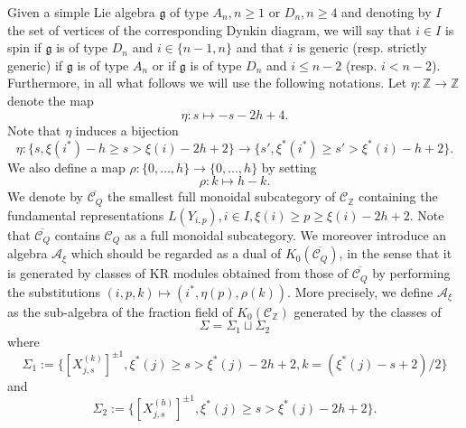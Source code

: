 \documentclass[12pt]{amsart}
\theoremstyle{plain}
\theoremstyle{definition}
\newtheorem{remark}[theorem]{Remark}
\numberwithin{equation}{section}
\newcommand{\ZZ}{{\mathbb {Z}}}
\newcommand{\tchi}{{\widetilde{\chi}}}
\newcommand{\tdxi}{\widetilde{D}_{\xi}}
\newcommand{\barD}{\overline{D}}
\newcommand{\CN}{\mathbb{C}[\mathbf{N}]}
\newcommand{\CQ}{\mathcal{C}_Q}
\newcommand{\CZ}{\mathcal{C}_{\mathbb{Z}}}
\newcommand{\barCQ}{\overline{\mathcal{C}_Q}}
\newcommand{\xistar}{\xi^{*}}
\begin{document}
Given  a simple Lie algebra $\mathfrak{g}$  of type $A_n , n\geq 1$ or $D_n, n \geq 4$ and denoting by $I$ the set of vertices of the corresponding Dynkin diagram, we will say that $i \in I$ is spin if $\mathfrak{g}$ is of type $D_n$ and 
$i \in \{n-1,n\}$ and that $i$ is generic (resp. strictly generic)  if $\mathfrak{g}$ is of type $A_n$ or if $\mathfrak{g}$ is of type $D_n$ and $i \leq n-2$ (resp. $i<n-2$). Furthermore, in all what follows we will use the following notations. Let $\eta : \mathbb{Z} \longrightarrow \mathbb{Z}$ denote the map 
$$\eta  : s \longmapsto -s-2h+4 . $$
Note that $\eta$ induces a bijection 
$$ \eta : \{ s  , \xi(i^{*})-h \geq s > \xi(i)-2h+2 \} \longrightarrow \{ s' ,  \xi^{*}(i^{*}) \geq s' > \xi^{*}(i)-h+2 \} .   $$
 We also define a map $\rho : \{ 0, \ldots , h\} \longrightarrow \{ 0, \ldots , h \}$ by setting
$$ \rho : k \longmapsto h-k . $$
We denote by $\barCQ$ the smallest full monoidal subcategory of $\CZ$ containing  the fundamental representations $L(Y_{i,p}) , i \in I , \xi(i) \geq p \geq \xi(i)-2h+2$. Note that $\barCQ$ contains $\CQ$ as a full monoidal subcategory.
  We moreover introduce an algebra $\mathcal{A}_{\xi}$ which should be regarded as a dual of $K_0(\barCQ)$, in the sense that it is generated by classes of KR modules obtained from those of $\barCQ$ by performing the substitutions $(i,p,k) \mapsto (i^{*}, \eta(p), \rho(k))$. More precisely, we define $\mathcal{A}_{\xi}$ as the sub-algebra of the fraction field of $K_0(\mathcal{C}_{\ZZ})$ generated by the classes of  
  $$ \Sigma = \Sigma_1 \sqcup \Sigma_2 $$
  where 
  $$ \Sigma_1 := \{ [X_{j,s}^{(k)}]^{\pm 1} ,\xistar(j) \geq s > \xistar(j)-2h+2 , k = (\xistar(j)-s+2)/2 \}  $$
 and
 $$\Sigma_2 := \{ [X_{j,s}^{(h)}]^{\pm 1} ,\xistar(j) \geq s > \xistar(j)-2h+2  \}.  $$
 
\end{document}
